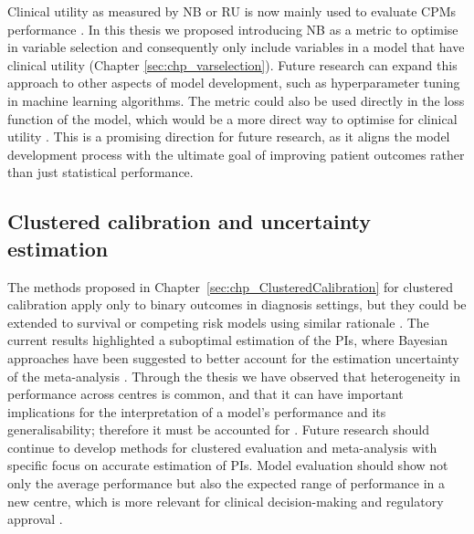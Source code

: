 Clinical utility as measured by \gls{NB} or \gls{RU} is now mainly used to evaluate \glspl{CPM} performance \cite{vancalsterReportingInterpretingDecision2018}. In this thesis we proposed introducing \gls{NB} as a metric to optimise in variable selection and consequently only include variables in a model that have clinical utility (Chapter \ref{sec:chp_varselection}). Future research can expand this approach to other aspects of model development, such as hyperparameter tuning in machine learning algorithms. The metric could also be used directly in the loss function of the model, which would be a more direct way to optimise for clinical utility \cite{vickersHypothesisNetBenefit2025,chiLearningInterpretableRisk2026}. This is a promising direction for future research, as it aligns the model development process with the ultimate goal of improving patient outcomes rather than just statistical performance.

\subsection{Clustered calibration and uncertainty estimation}

The methods proposed in Chapter~\ref{sec:chp_ClusteredCalibration} for clustered calibration apply only to binary outcomes in diagnosis settings, but they could be extended to survival or competing risk models using similar rationale \cite{austinGraphicalCalibrationCurves2022,austinGraphicalCalibrationCurves2020,barrenadaClusteredFlexibleCalibration2026}. The current results highlighted a suboptimal estimation of the \glspl{PI}, where Bayesian approaches have been suggested to better account for the estimation uncertainty of the meta-analysis \cite{partlettRandomEffectsMetaanalysis2017}. Through the thesis we have observed that heterogeneity in performance across centres is common, and that it can have important implications for the interpretation of a model's performance and its generalisability; therefore it must be accounted for \cite{barrenadaADNEXRiskPrediction2024,barrenadaHeadHeadComparison2025}. Future research should continue to develop methods for clustered evaluation and meta-analysis with specific focus on accurate estimation of \glspl{PI}. Model evaluation should show not only the average performance but also the expected range of performance in a new centre, which is more relevant for clinical decision-making and regulatory approval \cite{vancalsterPerformanceEvaluationPredictive2024}.

